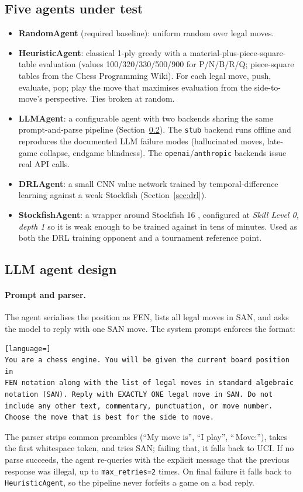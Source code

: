 \documentclass[11pt,a4paper]{article}
\begin{document}
\subsection{Five agents under test}
\label{sec:five-agents}

\begin{itemize}
  \item \textbf{RandomAgent} (required baseline): uniform random over
    legal moves.
  \item \textbf{HeuristicAgent}: classical 1-ply greedy with a
    material-plus-piece-square-table evaluation (values 100/320/330/500/900
    for P/N/B/R/Q; piece-square tables from the Chess Programming
    Wiki). For each legal move, push, evaluate, pop; play the move
    that maximises evaluation from the side-to-move's perspective.
    Ties broken at random.
  \item \textbf{LLMAgent}: a configurable agent with two backends
    sharing the same prompt-and-parse pipeline (Section~\ref{sec:llm}).
    The \texttt{stub} backend runs offline and reproduces the
    documented LLM failure modes (hallucinated moves, late-game
    collapse, endgame blindness). The \texttt{openai}/\texttt{anthropic}
    backends issue real API calls.
  \item \textbf{DRLAgent}: a small CNN value network trained by
    temporal-difference learning against a weak Stockfish
    (Section~\ref{sec:drl}).
  \item \textbf{StockfishAgent}: a wrapper around Stockfish 16
    \cite{stockfish}, configured at \emph{Skill Level 0, depth 1} so
    it is weak enough to be trained against in tens of minutes. Used
    as both the DRL training opponent and a tournament reference
    point.
\end{itemize}

\subsection{LLM agent design}
\label{sec:llm}

\paragraph{Prompt and parser.} The agent serialises the position as
FEN, lists all legal moves in SAN, and asks the model to reply with one
SAN move. The system prompt enforces the format:
\begin{lstlisting}[language=]
You are a chess engine. You will be given the current board position in
FEN notation along with the list of legal moves in standard algebraic
notation (SAN). Reply with EXACTLY ONE legal move in SAN. Do not
include any other text, commentary, punctuation, or move number.
Choose the move that is best for the side to move.
\end{lstlisting}
The parser strips common preambles (``My move is'', ``I play'', ``\,Move:''),
takes the first whitespace token, and tries SAN; failing that, it
falls back to UCI. If no parse succeeds, the agent re-queries with
the explicit message that the previous response was illegal, up to
\texttt{max\_retries=2} times. On final failure it falls back to
\texttt{HeuristicAgent}, so the pipeline never forfeits a game on a
bad reply.
\end{document}
